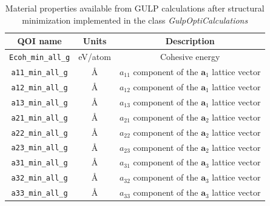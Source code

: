\begin{table}[p]
	\centering
	\caption{Material properties available from GULP calculations after structural minimization implemented in the class \emph{GulpOptiCalculations}}
	\label{tbl:pypospack_qoi_gulp_opti}
	\begin{tabular}{ccc}
		\hline
		QOI name & Units & Description \\
		\hline
		\verb|Ecoh_min_all_g|
		    & eV/atom
				& Cohesive energy\\
    \verb|a11_min_all_g|
		    & \AA
				& $a_{11}$ component of the $\bm{a}_1$ lattice vector \\
	  \verb|a12_min_all_g|
		    & \AA
				& $a_{12}$ component of the $\bm{a}_1$ lattice vector \\
	  \verb|a13_min_all_g|
		    & \AA
				& $a_{13}$ component of the $\bm{a}_1$ lattice vector \\
    \verb|a21_min_all_g|
		    & \AA
				& $a_{21}$ component of the $\bm{a}_2$ lattice vector\\
	  \verb|a22_min_all_g|
		    & \AA
				& $a_{22}$ component of the $\bm{a}_2$ lattice vector \\
	  \verb|a23_min_all_g|
		    & \AA
				& $a_{23}$ component of the $\bm{a}_2$ lattice vector \\
    \verb|a31_min_all_g|
		    & \AA
				& $a_{31}$ component of the $\bm{a}_3$ lattice vector \\
	  \verb|a32_min_all_g|
		    & \AA
				& $a_{32}$ component of the $\bm{a}_3$ lattice vector \\
	  \verb|a33_min_all_g|
		    & \AA
				& $a_{33}$ component of the $\bm{a}_3$ lattice vector \\
		\hline
	\end{tabular}
\end{table}


